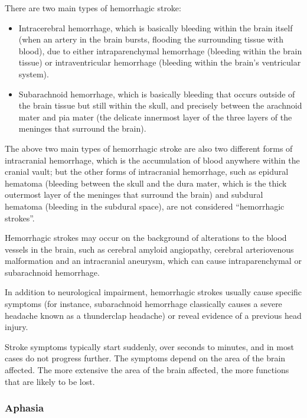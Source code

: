 There are two main types of hemorrhagic stroke:

\begin{itemize}
\tightlist
\item
  Intracerebral hemorrhage, which is basically bleeding within the brain
  itself (when an artery in the brain bursts, flooding the surrounding
  tissue with blood), due to either intraparenchymal hemorrhage
  (bleeding within the brain tissue) or intraventricular hemorrhage
  (bleeding within the brain's ventricular system).
\item
  Subarachnoid hemorrhage, which is basically bleeding that occurs
  outside of the brain tissue but still within the skull, and precisely
  between the arachnoid mater and pia mater (the delicate innermost
  layer of the three layers of the meninges that surround the brain).
\end{itemize}

The above two main types of hemorrhagic stroke are also two different
forms of intracranial hemorrhage, which is the accumulation of blood
anywhere within the cranial vault; but the other forms of intracranial
hemorrhage, such as epidural hematoma (bleeding between the skull and
the dura mater, which is the thick outermost layer of the meninges that
surround the brain) and subdural hematoma (bleeding in the subdural
space), are not considered ``hemorrhagic strokes''.

Hemorrhagic strokes may occur on the background of alterations to the
blood vessels in the brain, such as cerebral amyloid angiopathy,
cerebral arteriovenous malformation and an intracranial aneurysm, which
can cause intraparenchymal or subarachnoid hemorrhage.

In addition to neurological impairment, hemorrhagic strokes usually
cause specific symptoms (for instance, subarachnoid hemorrhage
classically causes a severe headache known as a thunderclap headache) or
reveal evidence of a previous head injury.

Stroke symptoms typically start suddenly, over seconds to minutes, and
in most cases do not progress further. The symptoms depend on the area
of the brain affected. The more extensive the area of the brain
affected, the more functions that are likely to be lost.

\hypertarget{aphasia}{%
\subsubsection{Aphasia}\label{aphasia}}

